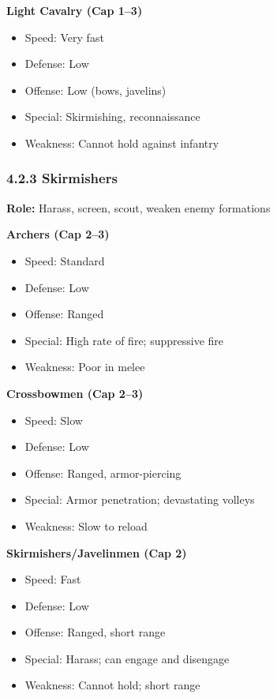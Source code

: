 \documentclass[11pt]{article}
\begin{document}
\textbf{Light Cavalry (Cap 1–3)}\\
\begin{itemize}
  \item Speed: Very fast
  \item Defense: Low
  \item Offense: Low (bows, javelins)
  \item Special: Skirmishing, reconnaissance
  \item Weakness: Cannot hold against infantry
\end{itemize}

\subsubsection{4.2.3 Skirmishers}

\textbf{Role:} Harass, screen, scout, weaken enemy formations

\textbf{Archers (Cap 2–3)}\\
\begin{itemize}
  \item Speed: Standard
  \item Defense: Low
  \item Offense: Ranged
  \item Special: High rate of fire; suppressive fire
  \item Weakness: Poor in melee
\end{itemize}

\textbf{Crossbowmen (Cap 2–3)}\\
\begin{itemize}
  \item Speed: Slow
  \item Defense: Low
  \item Offense: Ranged, armor-piercing
  \item Special: Armor penetration; devastating volleys
  \item Weakness: Slow to reload
\end{itemize}

\textbf{Skirmishers/Javelinmen (Cap 2)}\\
\begin{itemize}
  \item Speed: Fast
  \item Defense: Low
  \item Offense: Ranged, short range
  \item Special: Harass; can engage and disengage
  \item Weakness: Cannot hold; short range
\end{itemize}
\end{document}
